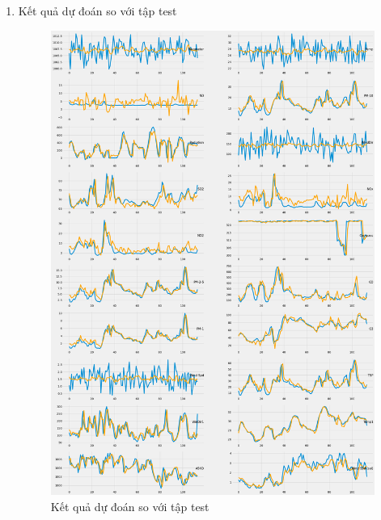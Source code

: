 \begin{enumerate}
\begin{itemize}
\end{itemize}

    \item Kết quả dự đoán so với tập test
    \begin{figure}[H]
        \centering
        \includegraphics[width=.95\textwidth]{figures/VAR_test.png}
        \caption[Kết quả dự đoán so với tập test]{Kết quả dự đoán so với tập test}
    \end{figure}

\end{enumerate}

